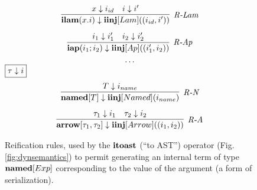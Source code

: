 \begin{figure}[t]
\begin{minipage}[t]{.44\textwidth}
\[\begin{array}{c}
\infer[\textit{R-Lam}]
	{ \keyw{ilam}(x.i) \downarrow \keyw{iinj}[Lam]((i_{id}, i')) }
	{x \downarrow i_{id} & i \downarrow i'} \\[2ex]

\infer[\textit{R-Ap}]
	{ \keyw{iap}(i_1; i_2) \downarrow \keyw{iinj}[Ap]((i_1', i_2))}
	{ i_1 \downarrow i_1' & i_2 \downarrow i_2' }\\[1ex]
\cdots
\vspace{-10px}
\end{array}
\]
$\fbox{$\tau \downarrow i$}$
\vspace{-12px}
\[
\begin{array}{c}
\infer[\textit{R-N}]
	{ \keyw{named}[T] \downarrow \keyw{iinj}[Named](i_{name}) }
	{ T \downarrow i_{name}} \\[2ex]

\infer[\textit{R-A}]
	{ \keyw{arrow}[\tau_1,\tau_2] \downarrow \keyw{iinj}[Arrow]((i_1, i_2))  }
	{ \tau_1 \downarrow i_1 & \tau_2 \downarrow i_2 }
\end{array}
\]
\caption{Reification rules, used by the $\textbf{itoast}$ (``to AST'') operator (Fig. \ref{fig:dynsemantics}) to permit generating an internal term of type $\textbf{named}[Exp]$ corresponding to the value of the argument (a form of serialization).}
\label{fig:reification}
\end{minipage}
\end{figure}
\newcommand{\Gout}{\Gamma_{\text{out}}}
\newcommand{\Gin}{\Gamma}
